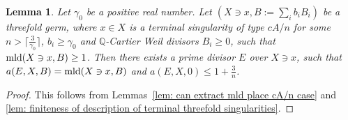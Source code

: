 \documentclass[11pt]{amsart}
\numberwithin{equation}{section}
\newcommand{\Qq}{\mathbb{Q}}
\newcommand{\mld}{{\rm{mld}}}
\newtheorem{lem}[thm]{Lemma}
\theoremstyle{definition}
\theoremstyle{definition}
\begin{document}
\begin{lem}\label{lem: bdd mld computing dcc cA/n type}
Let $\gamma_0$ be a positive real number. Let $(X\ni x,B:=\sum_{i}b_i B_i)$ be a threefold germ, where $x\in X$ is a terminal singularity of type $cA/n$ for some $n>\lceil\frac{3}{\gamma_0}\rceil$, $b_i\geq\gamma_0$ and $\Qq$-Cartier Weil divisors $B_i\geq 0$, such that $\mld(X\ni x,B)\ge 1$. Then there exists a prime divisor $E$ over $X\ni x$, such that $a(E,X,B)=\mld(X\ni x,B)$ and $a(E,X,0)\leq 1+\frac{3}{n}$.
\end{lem}

\begin{proof}
This follows from Lemmas~\ref{lem: can extract mld place cA/n case} and \ref{lem: finiteness of description of terminal threefold singularities}.
\end{proof}
\end{document}
